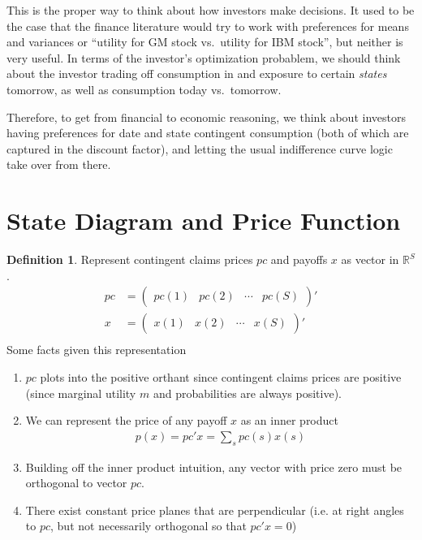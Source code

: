 \documentclass[12pt]{article}
\theoremstyle{plain}
\theoremstyle{definition}
\newtheorem{defn}[thm]{Definition}
\theoremstyle{remark}
\begin{document}
This is the proper way to think about how investors make decisions. It
used to be the case that the finance literature would try to work with
preferences for means and variances or ``utility for GM stock vs.\
utility for IBM stock'', but neither is very useful. In terms of the
investor's optimization probablem, we should think about the investor
trading off consumption in and exposure to certain \emph{states}
tomorrow, as well as consumption today vs.\ tomorrow.

Therefore, to get from financial to economic reasoning, we think about
investors having preferences for date and state contingent consumption
(both of which are captured in the discount factor), and letting the
usual indifference curve logic take over from there.


\section{State Diagram and Price Function}

\begin{defn}
Represent contingent claims prices $pc$ and payoffs $x$ as vector in
$\mathbb{R}^S$.
\begin{align*}
  pc &= \begin{pmatrix} pc(1) & pc(2) &\cdots & pc(S)\end{pmatrix}'\\
  x &= \begin{pmatrix} x(1) & x(2) &\cdots & x(S)\end{pmatrix}'\\
\end{align*}
Some facts given this representation
\begin{enumerate}
\item $pc$ plots into the positive orthant since contingent claims
  prices are positive (since marginal utility $m$ and probabilities are
  always positive).
\item We can represent the price of any payoff $x$ as an inner product
  \begin{align*}
    p(x) = pc'x = \sum_s pc(s) x(s)
  \end{align*}
\item Building off the inner product intuition, any vector with price
  zero must be orthogonal to vector $pc$.
\item There exist constant price planes that are perpendicular (i.e. at
  right angles to $pc$, but not necessarily orthogonal so that $pc'x=0$)
\end{enumerate}
\end{defn}
\end{document}
